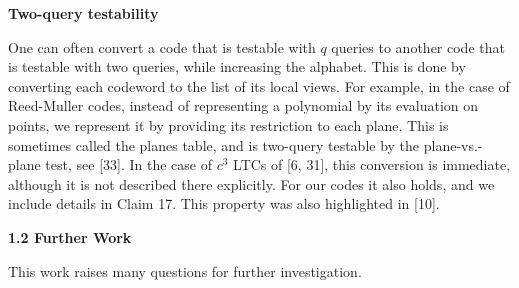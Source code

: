 \documentclass[10pt,a4paper]{article}
\begin{document}
\par\medskip\noindent\textbf{Two-query testability}\par




One can often convert a code that is testable with $q$ queries to another code that is testable with two queries, while increasing the alphabet. This is done by converting each codeword to the list of its local views. For example, in the case of Reed-Muller codes, instead of representing a polynomial by its evaluation on points, we represent it by providing its restriction to each plane. This is sometimes called the planes table, and is two-query testable by the plane-vs.-plane test, see [33]. In the case of $c^{3}$ LTCs of [6, 31], this conversion is immediate, although it is not described there explicitly. For our codes it also holds, and we include details in Claim 17. This property was also highlighted in [10].\par






\par\medskip\noindent\textbf{
1.2 Further Work}\par




This work raises many questions for further investigation.\par
\end{document}
